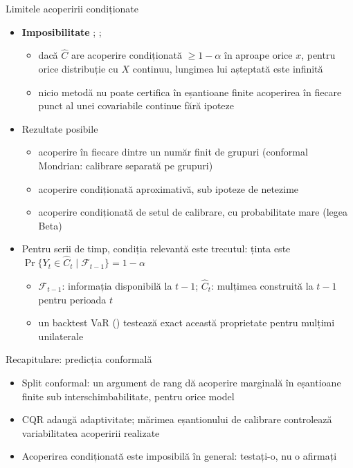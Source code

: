 \begin{frame}{Limitele acoperirii condiționate}
\itemsize{\small}
\begin{itemize}
    \item \textbf{Imposibilitate} ; ; 
    \begin{itemize}
        \item dacă $\hat C$ are acoperire condiționată $\ge 1 - \alpha$ în aproape orice $x$, pentru orice distribuție cu $X$ continuu, lungimea lui așteptată este infinită
        \item nicio metodă nu poate certifica în eșantioane finite acoperirea în fiecare punct al unei covariabile continue fără ipoteze
    \end{itemize}
    \item Rezultate posibile
    \begin{itemize}
        \item acoperire în fiecare dintre un număr finit de grupuri (conformal Mondrian: calibrare separată pe grupuri)
        \item acoperire condiționată aproximativă, sub ipoteze de netezime
        \item acoperire condiționată de setul de calibrare, cu probabilitate mare (legea Beta)
    \end{itemize}
    \item Pentru serii de timp, condiția relevantă este trecutul: ținta este $\Pr\{Y_t \in \hat C_t \mid \mathcal F_{t-1}\} = 1 - \alpha$
    \begin{itemize}
        \item $\mathcal F_{t-1}$: informația disponibilă la $t - 1$; $\hat C_t$: mulțimea construită la $t - 1$ pentru perioada $t$
        \item un backtest VaR () testează exact această proprietate pentru mulțimi unilaterale
    \end{itemize}
\end{itemize}
\end{frame}

\begin{frame}{Recapitulare: predicția conformală}
\itemsize{\small}
\begin{itemize}
    \item Split conformal: un argument de rang dă acoperire marginală în eșantioane finite sub interschimbabilitate, pentru orice model
    \item CQR adaugă adaptivitate; mărimea eșantionului de calibrare controlează variabilitatea acoperirii realizate
    \item Acoperirea condiționată este imposibilă în general: testați-o, nu o afirmați
\end{itemize}
\end{frame}


